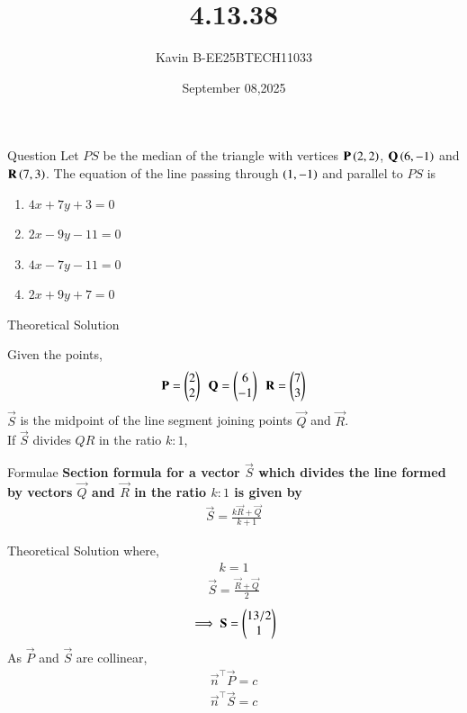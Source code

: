 \documentclass{beamer}
\begin{document}
\title 
{4.13.38}
\date{September 08,2025}


\author 
{Kavin B-EE25BTECH11033}






\frame{\titlepage}
\begin{frame}{Question}
Let $PS$ be the median of the triangle with vertices $\mathbf{P}\left(2, 2\right)$, $\mathbf{Q}\left(6, -1\right)$ and $\mathbf{R}\left(7,3\right)$. The equation of the line passing through $\left(1, -1\right)$ and parallel to $PS$ is 
\begin{multicols}{2}
\begin{enumerate}
\item $4x+7y+3=0$
\item $2x-9y-11=0$
\item $4x-7y-11=0$
\item $2x+9y+7=0$
\end{enumerate}
\end{multicols}
\end{frame}



\begin{frame}{Theoretical Solution}

Given the points,\\
\begin{align}
\mathbf{P}=\begin{pmatrix}2\\2\end{pmatrix}\ \ \mathbf{Q}=\begin{pmatrix}6\\-1\end{pmatrix}\ \ \mathbf{R}=\begin{pmatrix}7\\3\end{pmatrix}
\end{align}
$\vec{S}$ is the midpoint of the line segment joining points $\vec{Q}$ and $\vec{R}$.\\
If $\vec{S}$ divides $QR$ in the ratio $k : 1$,
\end{frame}

\begin{frame}{Formulae}
\textbf{Section formula for a vector $\vec{S}$ which divides the line formed by vectors $\vec{Q}$ and $\vec{R}$ in the ratio $k:1$ is given by}
\begin{align}
    \vec{S}=\frac{k\vec{R}+\vec{Q}}{k+1}
\end{align}
\end{frame}

\begin{frame}{Theoretical Solution}
where,
\begin{align}
    k=1
\end{align}
\begin{align}
    \vec{S}= \frac{\vec{R}+\vec{Q}}{2}
\end{align}
\begin{align}
    \implies\mathbf{S}= \begin{pmatrix}13/2\\1\end{pmatrix}
\end{align}
As $\vec{P}$ and $\vec{S}$ are collinear,
\begin{align}
    \vec{n}^{\top}\vec{P}=c\\
    \vec{n}^{\top}\vec{S}=c
\end{align}
\end{frame}
\end{document}
